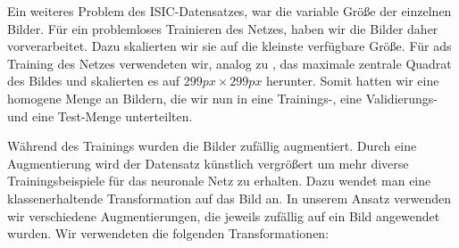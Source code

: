 Ein weiteres Problem des ISIC-Datensatzes, war die variable Größe der einzelnen Bilder. Für ein problemloses Trainieren des Netzes, haben wir die Bilder daher vorverarbeitet. Dazu skalierten wir sie auf die kleinste verfügbare Größe. Für ads Training des Netzes verwendeten wir, analog zu \citep{esteva2017dermatologist}, das maximale zentrale Quadrat des Bildes und skalierten es auf $299 px\times 299 px$ herunter. Somit hatten wir eine homogene Menge an Bildern, die wir nun in eine Trainings-, eine Validierungs- und eine Test-Menge unterteilten.

Während des Trainings wurden die Bilder zufällig augmentiert. Durch eine Augmentierung wird der Datensatz künstlich vergrößert um mehr diverse Trainingsbeispiele für das neuronale Netz zu erhalten. Dazu wendet man eine klassenerhaltende Transformation auf das Bild an. In unserem Ansatz verwenden wir verschiedene Augmentierungen, die jeweils zufällig auf ein Bild angewendet wurden. Wir verwendeten die folgenden Transformationen:

